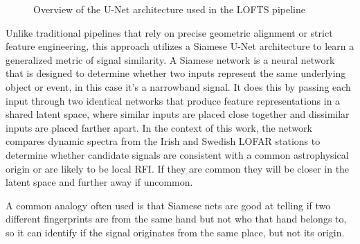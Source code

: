 \begin{figure}


    \caption{Overview of the U-Net architecture used in the LOFTS pipeline}
    \label{fig:Unet_arch}
\end{figure}


Unlike traditional pipelines that rely on precise geometric alignment or strict feature engineering, this approach utilizes a Siamese U-Net architecture to learn a generalized metric of signal similarity. A Siamese network is a neural network that is designed to determine whether two inputs represent the same underlying object or event, in this case it's a narrowband signal. It does this by passing each input through two identical networks that produce feature representations in a shared latent space, where similar inputs are placed close together and dissimilar inputs are placed farther apart. In the context of this work, the network compares dynamic spectra from the Irish and Swedish LOFAR stations to determine whether candidate signals are consistent with a common astrophysical origin or are likely to be local RFI. If they are common they will be closer in the latent space and further away if uncommon. 

A common analogy often used is that Siamese nets are good at telling if two different fingerprints are from the same hand but not who that hand belongs to, so it can identify if the signal originates from the same place, but not its origin. 

